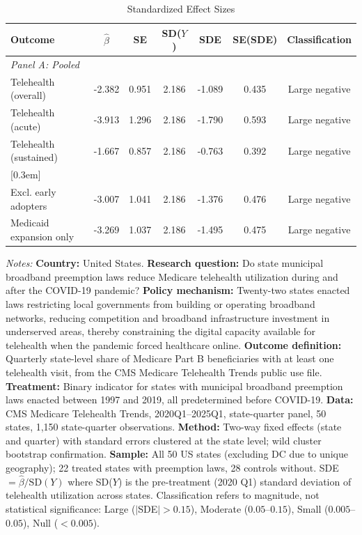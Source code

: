 \begin{table}[htbp]
\centering
\begin{threeparttable}
\caption{Standardized Effect Sizes}
\label{tab:sde}
\begin{tabular}{lcccccc}
\toprule
Outcome & $\hat{\beta}$ & SE & SD($Y$) & SDE & SE(SDE) & Classification \\
\midrule
\multicolumn{7}{l}{\textit{Panel A: Pooled}} \\
Telehealth (overall) & -2.382 & 0.951 & 2.186 & -1.089 & 0.435 & Large negative \\
Telehealth (acute) & -3.913 & 1.296 & 2.186 & -1.790 & 0.593 & Large negative \\
Telehealth (sustained) & -1.667 & 0.857 & 2.186 & -0.763 & 0.392 & Large negative \\
{}[0.3em]
\multicolumn{7}{l}{\textit{Panel B: Heterogeneous}} \\
Excl. early adopters & -3.007 & 1.041 & 2.186 & -1.376 & 0.476 & Large negative \\
Medicaid expansion only & -3.269 & 1.037 & 2.186 & -1.495 & 0.475 & Large negative \\
\bottomrule
\end{tabular}
\begin{tablenotes}[flushleft]\footnotesize
\item \textit{Notes:} \textbf{Country:} United States. \textbf{Research question:} Do state municipal broadband preemption laws reduce Medicare telehealth utilization during and after the COVID-19 pandemic? \textbf{Policy mechanism:} Twenty-two states enacted laws restricting local governments from building or operating broadband networks, reducing competition and broadband infrastructure investment in underserved areas, thereby constraining the digital capacity available for telehealth when the pandemic forced healthcare online. \textbf{Outcome definition:} Quarterly state-level share of Medicare Part B beneficiaries with at least one telehealth visit, from the CMS Medicare Telehealth Trends public use file. \textbf{Treatment:} Binary indicator for states with municipal broadband preemption laws enacted between 1997 and 2019, all predetermined before COVID-19. \textbf{Data:} CMS Medicare Telehealth Trends, 2020Q1--2025Q1, state-quarter panel, 50 states, 1,150 state-quarter observations. \textbf{Method:} Two-way fixed effects (state and quarter) with standard errors clustered at the state level; wild cluster bootstrap confirmation. \textbf{Sample:} All 50 US states (excluding DC due to unique geography); 22 treated states with preemption laws, 28 controls without. SDE $= \hat{\beta} / \text{SD}(Y)$ where SD($Y$) is the pre-treatment (2020 Q1) standard deviation of telehealth utilization across states. Classification refers to magnitude, not statistical significance: Large ($|$SDE$| > 0.15$), Moderate ($0.05$--$0.15$), Small ($0.005$--$0.05$), Null ($< 0.005$).
\end{tablenotes}
\end{threeparttable}
\end{table}

